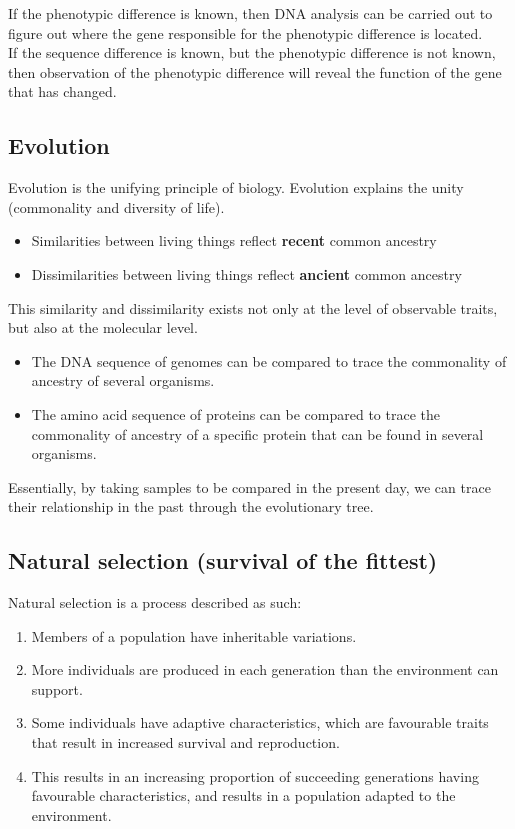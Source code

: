 \documentclass[11pt]{article}
\begin{document}
If the phenotypic difference is known, then DNA analysis can be carried out to figure out where the gene responsible for the phenotypic difference is located.
\\[0pt]

If the sequence difference is known, but the phenotypic difference is not known, then observation of the phenotypic difference will reveal the function of the gene that has changed.

\subsection{Evolution}
\label{sec:org46bde38}
Evolution is the unifying principle of biology. Evolution explains the unity (commonality and diversity of life).
\begin{itemize}
\item Similarities between living things reflect \textbf{recent} common ancestry
\item Dissimilarities between living things reflect \textbf{ancient} common ancestry
\end{itemize}

This similarity and dissimilarity exists not only at the level of observable traits, but also at the molecular level.
\begin{itemize}
\item The DNA sequence of genomes can be compared to trace the commonality of ancestry of several organisms.
\item The amino acid sequence of proteins can be compared to trace the commonality of ancestry of a specific protein that can be found in several organisms.
\end{itemize}

Essentially, by taking samples to be compared in the present day, we can trace their relationship in the past through the evolutionary tree.

\newpage

\subsection{Natural selection (survival of the fittest)}
\label{sec:orgb3513e0}
Natural selection is a process described as such:
\begin{enumerate}
\item Members of a population have inheritable variations.
\item More individuals are produced in each generation than the environment can support.
\item Some individuals have adaptive characteristics, which are favourable traits that result in increased survival and reproduction.
\item This results in an increasing proportion of succeeding generations having favourable characteristics, and results in a population adapted to the environment.
\end{enumerate}
\end{document}
